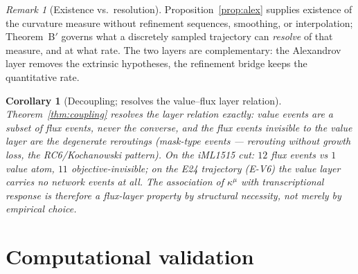 \documentclass[11pt,a4paper]{article}
\theoremstyle{plain}
\newtheorem{corollary}[theorem]{Corollary}
\theoremstyle{definition}
\theoremstyle{remark}
\newtheorem{remark}[theorem]{Remark}
\newcommand{\kmu}{\kappa^{\mu}}
\begin{document}
\begin{remark}[Existence vs.\ resolution]
Proposition~\ref{prop:alex} supplies existence of the curvature measure
without refinement sequences, smoothing, or interpolation; Theorem~B$'$
governs what a discretely sampled trajectory can \emph{resolve} of that
measure, and at what rate. The two layers are complementary: the
Alexandrov layer removes the extrinsic hypotheses, the refinement
bridge keeps the quantitative rate.
\end{remark}

\begin{corollary}[Decoupling; resolves the value--flux layer
relation]\label{conj:valueflux}
Theorem~\ref{thm:coupling} resolves the layer relation exactly: value
events are a subset of flux events, never the converse, and the flux
events invisible to the value layer are the degenerate reroutings
(mask-type events --- rerouting without growth loss, the
RC6/Kochanowski pattern). On the iML1515 cut: $12$ flux events vs $1$
value atom, $11$ objective-invisible; on the E24 trajectory (E-V6) the
value layer carries no network events at all. The association of
$\kmu$ with transcriptional response is therefore a flux-layer
property by structural necessity, not merely by empirical choice.
\end{corollary}

\section{Computational validation}\label{sec:computational}

\end{document}
